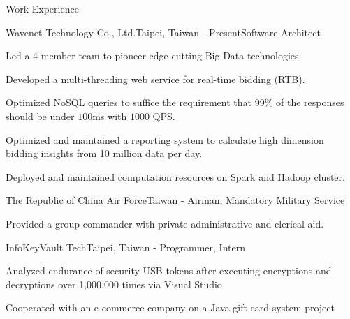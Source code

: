 \documentclass{cv}
\begin{document}
\begin{cvSection}{Work Experience}

\begin{experienceSubsection}{Wavenet Technology Co., Ltd.}{Taipei, Taiwan}{ - Present}{Software Architect}

\item Led a 4-member team to pioneer edge-cutting Big Data technologies.
\item Developed a multi-threading web service for real-time bidding (RTB).
\item Optimized NoSQL queries to suffice the requirement that $99\%$ of the responses should be under $100$ms with $1000$ QPS.
\item Optimized and maintained a reporting system to calculate high dimension bidding insights from 10 million data per day.
\item Deployed and maintained computation resources on Spark and Hadoop cluster. 

\end{experienceSubsection}

\begin{experienceSubsection}{The Republic of China Air Force}{Taiwan}{ - }{Airman, Mandatory Military Service}

\item Provided a group commander with private administrative and clerical aid.

\end{experienceSubsection}

\begin{experienceSubsection}{InfoKeyVault Tech}{Taipei, Taiwan}{ - }{Programmer, Intern}

\item Analyzed endurance of security USB tokens after executing encryptions and decryptions over 1,000,000 times via Visual Studio
\item Cooperated with an e-commerce company on a Java gift card system project

\end{experienceSubsection}

\end{cvSection}
\end{document}

